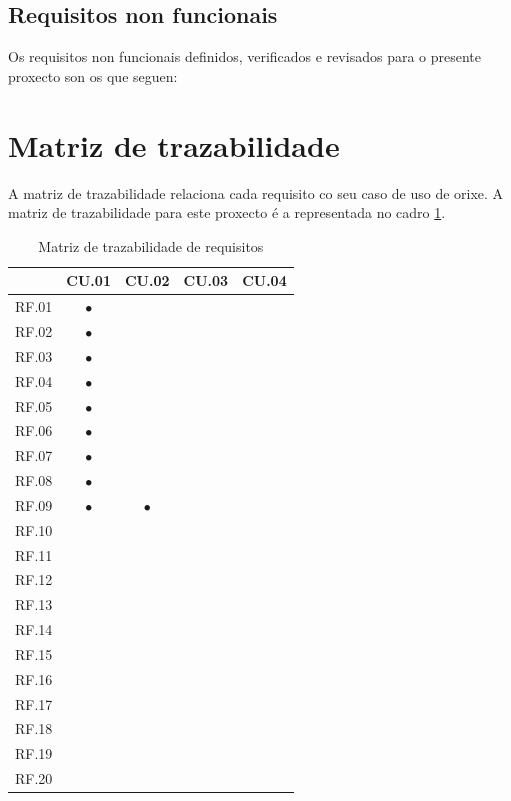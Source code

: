 		  	{}%
			{}%
			{}%
			
		  	{}%
			{}%
			{}%

\subsection{Requisitos non funcionais}
Os requisitos non funcionais definidos, verificados e revisados para o presente proxecto son os que seguen:

		  	{}%
			{}%
			{}%

\section{Matriz de trazabilidade}
A matriz de trazabilidade relaciona cada requisito co seu caso de uso de orixe. A matriz de trazabilidade para este proxecto é a representada no cadro \ref{tab:trazaRequisitos}.

\begin{table}[htbp]
\centering
\begin{tabular}{|l|c|c|c|c|}
\hline
 & CU.01 & CU.02 & CU.03 & CU.04 \\ \hline
RF.01 & $\bullet$ &  &  &  \\ \hline
RF.02 & $\bullet$ &  &  &  \\ \hline
RF.03 & $\bullet$ &  &  &  \\ \hline
RF.04 & $\bullet$ &  &  &  \\ \hline
RF.05 & $\bullet$ &  &  &  \\ \hline
RF.06 & $\bullet$ &  &  &  \\ \hline
RF.07 & $\bullet$ &  &  &  \\ \hline
RF.08 & $\bullet$ &  &  &  \\ \hline
RF.09 & $\bullet$ & $\bullet$ &  &  \\ \hline
RF.10 &  &  &  &  \\ \hline
RF.11 &  &  &  &  \\ \hline
RF.12 &  &  &  &  \\ \hline
RF.13 &  &  &  &  \\ \hline
RF.14 &  &  &  &  \\ \hline
RF.15 &  &  &  &  \\ \hline
RF.16 &  &  &  &  \\ \hline
RF.17 &  &  &  &  \\ \hline
RF.18 &  &  &  &  \\ \hline
RF.19 &  &  &  &  \\ \hline
RF.20 &  &  &  &  \\ \hline
\end{tabular}
\caption{Matriz de trazabilidade de requisitos}
\label{tab:trazaRequisitos}
\end{table}
